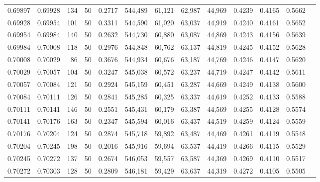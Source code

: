 \begin{tabular}{rrrrrrrrrrrrr}
0.69897 & 0.69928 &   134 &  50 &                                     0.2717 & 544,489 &  61,121 &  62,987 &  44,969 & 0.4239 & 0.4165 & 0.5662 \\
0.69928 & 0.69954 &   101 &  50 &                                     0.3311 & 544,590 &  61,020 &  63,037 &  44,919 & 0.4240 & 0.4161 & 0.5652 \\
0.69954 & 0.69984 &   140 &  50 &                                     0.2632 & 544,730 &  60,880 &  63,087 &  44,869 & 0.4243 & 0.4156 & 0.5639 \\
0.69984 & 0.70008 &   118 &  50 &                                     0.2976 & 544,848 &  60,762 &  63,137 &  44,819 & 0.4245 & 0.4152 & 0.5628 \\
0.70008 & 0.70029 &    86 &  50 &                                     0.3676 & 544,934 &  60,676 &  63,187 &  44,769 & 0.4246 & 0.4147 & 0.5620 \\
0.70029 & 0.70057 &   104 &  50 &                                     0.3247 & 545,038 &  60,572 &  63,237 &  44,719 & 0.4247 & 0.4142 & 0.5611 \\
0.70057 & 0.70084 &   121 &  50 &                                     0.2924 & 545,159 &  60,451 &  63,287 &  44,669 & 0.4249 & 0.4138 & 0.5600 \\
0.70084 & 0.70111 &   126 &  50 &                                     0.2841 & 545,285 &  60,325 &  63,337 &  44,619 & 0.4252 & 0.4133 & 0.5588 \\
0.70111 & 0.70141 &   146 &  50 &                                     0.2551 & 545,431 &  60,179 &  63,387 &  44,569 & 0.4255 & 0.4128 & 0.5574 \\
0.70141 & 0.70176 &   163 &  50 &                                     0.2347 & 545,594 &  60,016 &  63,437 &  44,519 & 0.4259 & 0.4124 & 0.5559 \\
0.70176 & 0.70204 &   124 &  50 &                                     0.2874 & 545,718 &  59,892 &  63,487 &  44,469 & 0.4261 & 0.4119 & 0.5548 \\
0.70204 & 0.70245 &   198 &  50 &                                     0.2016 & 545,916 &  59,694 &  63,537 &  44,419 & 0.4266 & 0.4115 & 0.5529 \\
0.70245 & 0.70272 &   137 &  50 &                                     0.2674 & 546,053 &  59,557 &  63,587 &  44,369 & 0.4269 & 0.4110 & 0.5517 \\
0.70272 & 0.70303 &   128 &  50 &                                     0.2809 & 546,181 &  59,429 &  63,637 &  44,319 & 0.4272 & 0.4105 & 0.5505 \\

\end{tabular}
